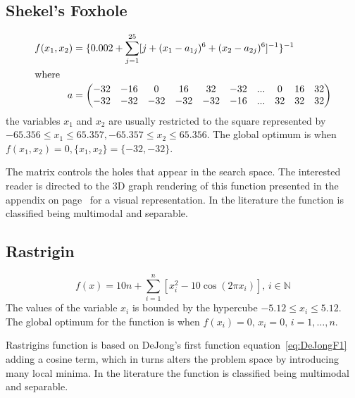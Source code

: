 \subsection{Shekel's Foxhole}
\begin{align}
\label{eq:shekel}
	f(x_1,x_2) &= \{0.002 + \sum^{25}_{j=1} [j + (x_1 - a_{1j})^6 + (x_2 - a_{2j})^6]^{-1}\}^{-1}\\
\intertext{where}
	a &= \begin{pmatrix} \nonumber
			-32 & -16 & 0 & 16 & 32 & -32 & ... & 0 & 16 & 32 \\
			-32 & -32 & -32 & -32 & -32 & -16 & ... & 32 & 32 & 32 \\
		 \end{pmatrix}
\end{align}
the variables $x_1$ and $x_2$ are usually restricted to the square represented by $-65.356 \leq x_1 \leq 65.357, -65.357 \leq x_2 \leq 65.356$\cite{ABCCompareStudy,TSGlobalOptimization,ContinACSTS,TestFunctions}. The global optimum is when $f(x_1,x_2) = 0, \{x_1,x_2\} = \{-32,-32\}$\cite{ABCCompareStudy,TSGlobalOptimization,ContinACSTS,TestFunctions}.

The matrix controls the holes that appear in the search space. The interested reader is directed to the 3D graph rendering of this function presented in the appendix on page~\pageref{fig:ShekelGraph} for a visual representation. In the literature the function is classified being multimodal and separable\cite{adaptPSO,ABCCompareStudy,TestFunctions}.
\subsection{Rastrigin}
\begin{equation}
	f(x) = 10n + \sum_{i=1}^n [x_i^2 - 10\cos(2 \pi x_i)],\, i \in \mathbb{N}
\end{equation}
The values of the variable $x_i$ is bounded by the hypercube $-5.12 \leq x_i \leq 5.12$\cite{adaptPSO,ABCCompareStudy,numericalABC,ARPSO,PerfABC,HybridIntelliGA,TestFunctions}. The global optimum for the function is when $f(x_i) = 0,\, x_i = 0, \, i = 1,\dots,n$\cite{adaptPSO,ABCCompareStudy,numericalABC,HybridIntelliGA,TestFunctions}.

Rastrigins function is based on DeJong's first function equation~\ref{eq:DeJongF1} adding a cosine term, which in turns alters the problem space by introducing many local minima\cite{numericalABC,PerfABC,HybridIntelliGA,TestFunctions}. In the literature the function is classified being multimodal and separable\cite{adaptPSO,ABCCompareStudy,numericalABC,ARPSO,ChaoticABC,PerfABC,HybridIntelliGA,TestFunctions}.
